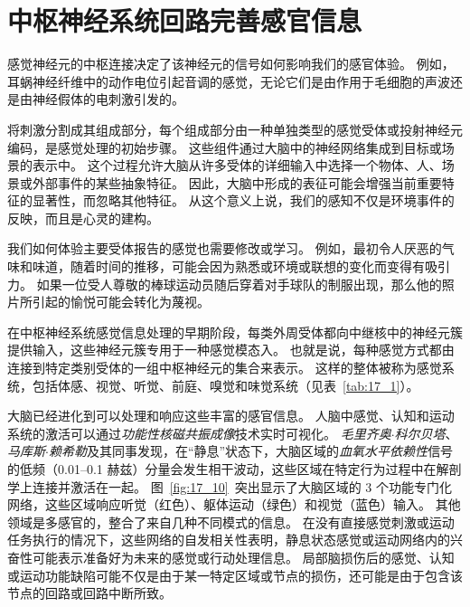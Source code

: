 \section{中枢神经系统回路完善感官信息}

感觉神经元的中枢连接决定了该神经元的信号如何影响我们的感官体验。 
例如，耳蜗神经纤维中的动作电位引起音调的感觉，无论它们是由作用于毛细胞的声波还是由神经假体的电刺激引发的。

将刺激分割成其组成部分，每个组成部分由一种单独类型的感觉受体或投射神经元编码，是感觉处理的初始步骤。
这些组件通过大脑中的神经网络集成到目标或场景的表示中。
这个过程允许大脑从许多受体的详细输入中选择一个物体、人、场景或外部事件的某些抽象特征。
因此，大脑中形成的表征可能会增强当前重要特征的显著性，而忽略其他特征。
从这个意义上说，我们的感知不仅是环境事件的反映，而且是心灵的建构。


我们如何体验主要受体报告的感觉也需要修改或学习。 
例如，最初令人厌恶的气味和味道，随着时间的推移，可能会因为熟悉或环境或联想的变化而变得有吸引力。
如果一位受人尊敬的棒球运动员随后穿着对手球队的制服出现，那么他的照片所引起的愉悦可能会转化为蔑视。


在中枢神经系统感觉信息处理的早期阶段，每类外周受体都向中继核中的神经元簇提供输入，这些神经元簇专用于一种感觉模态入。 
也就是说，每种感觉方式都由连接到特定类别受体的一组中枢神经元的集合来表示。 
这样的整体被称为感觉系统，包括体感、视觉、听觉、前庭、嗅觉和味觉系统（见表~\ref{tab:17_1}）。


大脑已经进化到可以处理和响应这些丰富的感官信息。 
人脑中感觉、认知和运动系统的激活可以通过\textit{功能性核磁共振成像}技术实时可视化。
\textit{毛里齐奥$\cdot$科尔贝塔}、\textit{马库斯$\cdot$赖希勒}及其同事发现，在“静息”状态下，大脑区域的\textit{血氧水平依赖性}信号的低频（0.01–0.1 赫兹）分量会发生相干波动，这些区域在特定行为过程中在解剖学上连接并激活在一起。
图~\ref{fig:17_10}~突出显示了大脑区域的 3 个功能专门化网络，这些区域响应听觉（红色）、躯体运动（绿色）和视觉（蓝色）输入。
其他领域是多感官的，整合了来自几种不同模式的信息。 
在没有直接感觉刺激或运动任务执行的情况下，这些网络的自发相关性表明，静息状态感觉或运动网络内的兴奋性可能表示准备好为未来的感觉或行动处理信息。 
局部脑损伤后的感觉、认知或运动功能缺陷可能不仅是由于某一特定区域或节点的损伤，还可能是由于包含该节点的回路或回路中断所致。


